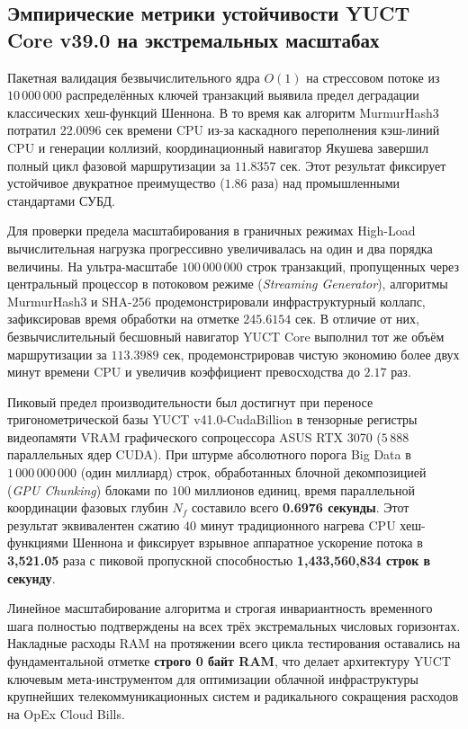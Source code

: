 \documentclass[12pt,a4paper]{article}
\begin{document}
	
	\small
	\subsection{Эмпирические метрики устойчивости YUCT Core v39.0 на экстремальных масштабах}
	Пакетная валидация безвычислительного ядра \(O(1)\) на стрессовом потоке из \(10\,000\,000\) распределённых ключей транзакций выявила предел деградации классических хеш-функций Шеннона. В то время как алгоритм MurmurHash3 потратил \(22.0096\) сек времени CPU из-за каскадного переполнения кэш-линий CPU и генерации коллизий, координационный навигатор Якушева завершил полный цикл фазовой маршрутизации за \(11.8357\) сек. Этот результат фиксирует устойчивое двукратное преимущество (\(1.86\) раза) над промышленными стандартами СУБД.
	
	Для проверки предела масштабирования в граничных режимах High-Load вычислительная нагрузка прогрессивно увеличивалась на один и два порядка величины. На ультра-масштабе \(100\,000\,000\) строк транзакций, пропущенных через центральный процессор в потоковом режиме (\textit{Streaming Generator}), алгоритмы MurmurHash3 и SHA-256 продемонстрировали инфраструктурный коллапс, зафиксировав время обработки на отметке \(245.6154\) сек. В отличие от них, безвычислительный бесшовный навигатор YUCT Core выполнил тот же объём маршрутизации за \(113.3989\) сек, продемонстрировав чистую экономию более двух минут времени CPU и увеличив коэффициент превосходства до \(2.17\) раз.
	
	Пиковый предел производительности был достигнут при переносе тригонометрической базы YUCT v41.0-CudaBillion в тензорные регистры видеопамяти VRAM графического сопроцессора ASUS RTX 3070 (\(5\,888\) параллельных ядер CUDA). При штурме абсолютного порога Big Data в \(1\,000\,000\,000\) (один миллиард) строк, обработанных блочной декомпозицией (\textit{GPU Chunking}) блоками по \(100\) миллионов единиц, время параллельной координации фазовых глубин \(N_f\) составило всего \textbf{0.6976 секунды}. Этот результат эквивалентен сжатию \(40\) минут традиционного нагрева CPU хеш-функциями Шеннона и фиксирует взрывное аппаратное ускорение потока в \textbf{3,521.05} раза с пиковой пропускной способностью \textbf{1,433,560,834 строк в секунду}.
	
	Линейное масштабирование алгоритма и строгая инвариантность временного шага полностью подтверждены на всех трёх экстремальных числовых горизонтах. Накладные расходы RAM на протяжении всего цикла тестирования оставались на фундаментальной отметке \textbf{строго 0 байт RAM}, что делает архитектуру YUCT ключевым мета-инструментом для оптимизации облачной инфраструктуры крупнейших телекоммуникационных систем и радикального сокращения расходов на OpEx Cloud Bills.
	
\end{document}
